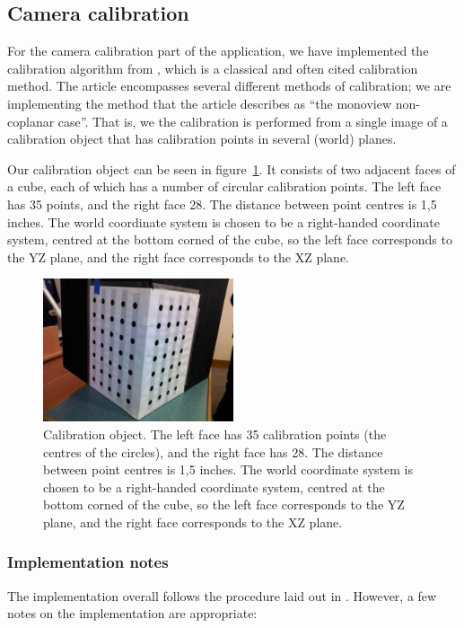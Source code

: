 \subsection{Camera calibration}
For the camera calibration part of the application, we have
implemented the calibration algorithm from \cite{TSAI}, which is a
classical and often cited calibration method. The article encompasses
several different methods of calibration; we are implementing the
method that the article describes as ``the monoview non-coplanar
case''. That is, we the calibration is performed from a single image
of a calibration object that has calibration points in several (world)
planes.

Our calibration object can be seen in figure~\ref{fig:calib-object}.
It consists of two adjacent faces of a cube, each of which has a
number of circular calibration points. The left face has 35 points,
and the right face 28. The distance between point centres is 1,5
inches. The world coordinate system is chosen to be a right-handed
coordinate system, centred at the bottom corned of the cube, so the
left face corresponds to the YZ plane, and the right face corresponds
to the XZ plane.

\begin{figure}[hb]
  \centering
  \includegraphics[width=0.5\textwidth]{figures/calibration-object}
  \caption{Calibration object. The left face has 35 calibration points
    (the centres of the circles), and the right face has 28. The
    distance between point centres is 1,5 inches. The world coordinate
    system is chosen to be a right-handed coordinate system, centred
    at the bottom corned of the cube, so the left face corresponds to
    the YZ plane, and the right face corresponds to the XZ plane.}
  \label{fig:calib-object}
\end{figure}

\subsubsection{Implementation notes}
The implementation overall follows the procedure laid out in
\cite{TSAI}. However, a few notes on the implementation are
appropriate:

